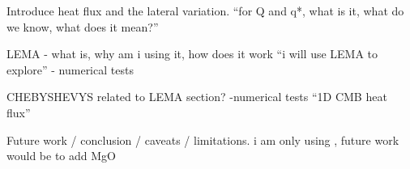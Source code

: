 Introduce heat flux and the lateral variation. ``for Q and q*, what is it, what do we know, what does it mean?'' 

LEMA - what is, why am i using it, how does it work ``i will use LEMA to explore'' - numerical tests

CHEBYSHEVYS related to LEMA section? -numerical tests ``1D CMB heat flux''

Future work / conclusion / caveats / limitations. i am only using \bdg, future work would be to add MgO















